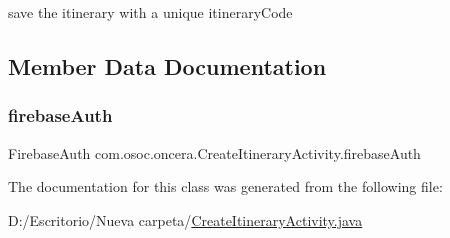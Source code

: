 save the itinerary with a unique itinerary\+Code 

\subsection{Member Data Documentation}
\mbox{\label{classcom_1_1osoc_1_1oncera_1_1_create_itinerary_activity_ab0c5a552c3170ef5a07c8cea31814138}} 
\subsubsection{\texorpdfstring{firebaseAuth}{firebaseAuth}}
{\footnotesize\ttfamily Firebase\+Auth com.\+osoc.\+oncera.\+Create\+Itinerary\+Activity.\+firebase\+Auth\hspace{0.3cm}{\ttfamily [static]}}



The documentation for this class was generated from the following file\+:\begin{DoxyCompactItemize}
\item 
D\+:/\+Escritorio/\+Nueva carpeta/\mbox{\hyperlink{_create_itinerary_activity_8java}{Create\+Itinerary\+Activity.\+java}}\end{DoxyCompactItemize}

